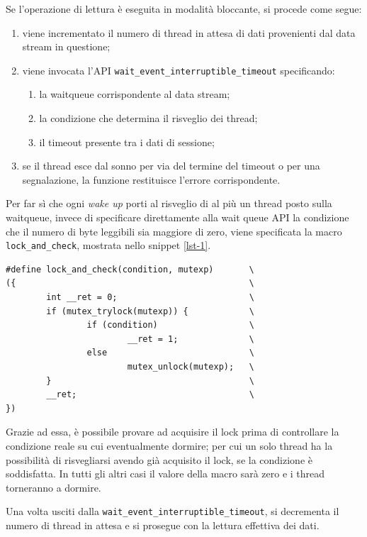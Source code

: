 \documentclass{article}
\begin{document}
Se l'operazione di lettura è eseguita in modalità bloccante, si procede come segue:
\begin{enumerate}
\item viene incrementato il numero di thread in attesa di dati provenienti dal data stream in questione;
\item viene invocata l'API \texttt{wait\_event\_interruptible\_timeout} specificando:
\begin{enumerate}
\item la waitqueue corrispondente al data stream;
\item la condizione che determina il risveglio dei thread;
\item il timeout presente tra i dati di sessione;
\end{enumerate}
\item se il thread esce dal sonno per via del termine del timeout o per una segnalazione, la funzione restituisce l'errore corrispondente.
\end{enumerate}
Per far sì che ogni \textsl{wake up} porti al risveglio di al più un thread posto sulla waitqueue, invece di specificare direttamente alla wait queue API la condizione che il numero di byte leggibili sia maggiore di zero, viene specificata la macro \texttt{lock\_and\_check}, mostrata nello snippet \ref{lst-1}.
\begin{lstlisting}[label=lst-1, caption={Macro \texttt{lock\_and\_check}}]
#define lock_and_check(condition, mutexp)       \
({                                              \
        int __ret = 0;                          \
        if (mutex_trylock(mutexp)) {            \
                if (condition)                  \
                        __ret = 1;              \
                else                            \
                        mutex_unlock(mutexp);   \
        }                                       \
        __ret;                                  \
})
\end{lstlisting}
Grazie ad essa, è possibile provare ad acquisire il lock prima di controllare la condizione reale su cui eventualmente dormire; per cui un solo thread ha la possibilità di risvegliarsi avendo già acquisito il lock, se la condizione è soddisfatta. In tutti gli altri casi il valore della macro sarà zero e i thread torneranno a dormire.

Una volta usciti dalla \texttt{wait\_event\_interruptible\_timeout}, si decrementa il numero di thread in attesa e si prosegue con la lettura effettiva dei dati.
\end{document}
